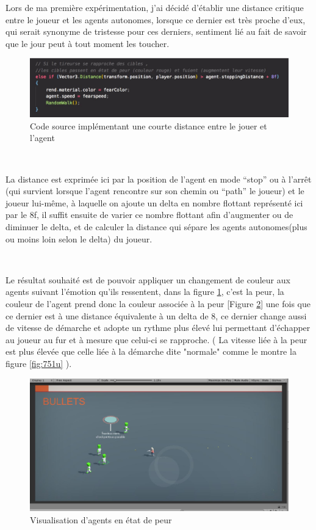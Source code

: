 Lors de ma première expérimentation, j’ai décidé d’établir une distance critique entre le joueur et les agents autonomes, lorsque ce dernier est très proche d’eux, qui serait synonyme de tristesse pour ces derniers, sentiment lié au fait de savoir que le jour peut à tout moment les toucher.


\begin{figure}[th]
\centering
\includegraphics{Figures/fonctdist.JPG}
\decoRule
\caption[Code source implémentant une courte distance ]{Code source implémentant une courte distance entre le jouer et l'agent}
\label{fig:751}
\end{figure}



~\par
La distance est exprimée ici par la position de l’agent en mode “stop” ou à l'arrêt (qui survient lorsque l’agent rencontre sur son chemin ou “path” le joueur) et le joueur lui-même, à laquelle on ajoute un delta en nombre flottant représenté ici par le 8f, il suffit ensuite de varier ce nombre flottant afin d’augmenter ou de diminuer le delta, et de calculer la distance qui sépare les agents autonomes(plus ou moins loin selon le delta) du joueur. 

~\par
Le résultat souhaité est de pouvoir appliquer un changement de couleur aux agents suivant l’émotion qu’ils ressentent, dans la figure \ref{fig:751}, c’est la peur, la couleur de l’agent prend donc la couleur associée à la peur [Figure \ref{fig:bichi1}] une fois que ce dernier est à une distance équivalente à un delta de 8, ce dernier change aussi de vitesse de démarche et adopte un rythme plus élevé lui permettant d'échapper au joueur au fur et à mesure que celui-ci se rapproche. ( La vitesse liée à la peur est plus élevée que celle liée à la démarche dite "normale" comme le montre la figure \ref{fig:751u} ).


\begin{figure}[th]
\centering
\includegraphics{Figures/bichi1.JPG}
\decoRule
\caption[Visualisation d'agents en état de peur]{Visualisation d'agents en état de peur}
\label{fig:bichi1}
\end{figure}



